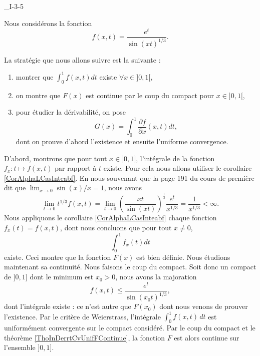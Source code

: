 

\begin{corrige}{_I-3-5}

Nous considérons la fonction 
\begin{equation}
	f(x,t)=\frac{  e^{t} }{  \sin(xt)^{1/3} }.
\end{equation}

La stratégie que nous allons suivre est la suivante :
\begin{enumerate}
	\item montrer que $\int_{0}^1f(x,t)dt$ existe $\forall x\in]0,1[$,
	\item on montre que $F(x)$ est continue par le coup du compact pour $x\in]0,1[$,
	\item pour étudier la dérivabilité, on pose
	\begin{equation}
		G(x)=\int_0^1\frac{ \partial f }{ \partial x }(x,t)dt,
	\end{equation}
	dont on prouve d'abord l'existence et ensuite l'uniforme convergence.
\end{enumerate}

D'abord, montrons que pour tout $x\in ]0,1]$, l'intégrale de la fonction $f_x\colon t\mapsto f(x,t)$ par rapport à $t$ existe. Pour cela nous allons utiliser le corollaire \ref{CorAlphaLCasInteabf}. En nous souvenant que la page 191 du cours de première dit que $\lim_{x\to 0}\sin(x)/x=1$, nous avons
\begin{equation}
		\lim_{t\to0}t^{1/3}f(x,t)=\lim_{t\to 0}\left( \frac{ xt }{ \sin(xt) } \right)^{\frac{ 1 }{ 3 }}\frac{ e^t }{ x^{1/3} }=\frac{1}{ x^{1/3} }<\infty.
\end{equation}
Nous appliquons le corollaire \ref{CorAlphaLCasInteabf} chaque fonction $f_x(t)=f(x,t)$, dont nous concluons que pour tout $x\neq 0$,
\begin{equation}
	\int_0^1 f_x(t)dt
\end{equation}
existe. Ceci montre que la fonction $F(x)$ est bien définie. Nous étudions maintenant sa continuité. Nous faisons le coup du compact. Soit donc un compact de $]0,1]$ dont le minimum est $x_0>0$, nous avons la majoration
\begin{equation}
	f(x,t)\leq\frac{ e^t }{ \sin(x_0t)^{1/3} },
\end{equation}
dont l'intégrale existe : ce n'est autre que $F(x_0)$ dont nous venons de prouver l'existence. Par le critère de Weierstrass, l'intégrale $\int_0^1f(x,t)\,dt$ est uniformément convergente sur le compact considéré. Par le coup du compact et le théorème \ref{ThoInDerrtCvUnifFContinue}, la fonction $F$ est alors continue sur l'ensemble $]0,1]$.


\end{corrige}

